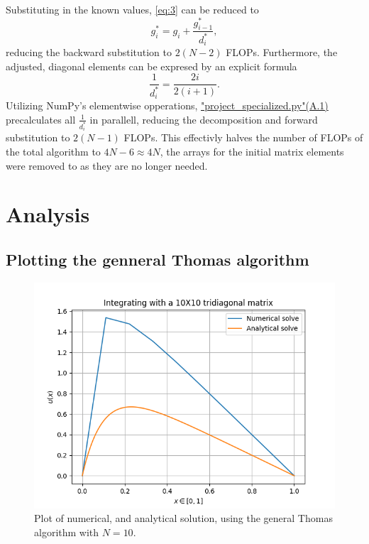 \documentclass[english,notitlepage,reprint]{revtex4-1}  %
\begin{document}
Substituting in the known values, \eqref{eq:3} can be reduced to
$$
	g_{i}^{*} = g_{i} + \frac{g_{i-1}^{*}}{d_{i}^{*}},
$$
reducing the backward substitution to \(2(N-2)\) FLOPs.
Furthermore, the adjusted, diagonal elements can be expresed by an explicit formula
$$
	\frac{1}{d_{i}^{*}}=\frac{2i}{2(i+1)}.
$$
Utilizing NumPy's elementwise opperations, \hyperref[A:2]{"project\_specialized.py"(A.1)} precalculates all \(\frac{1}{d_{i}^{*}}\) in parallell, reducing the decomposition and forward substitution to \(2(N-1)\) FLOPs. This effectivly halves the number of FLOPs of the total algorithm to \(4N-6\approx 4N\), the arrays for the initial matrix elements were removed to as they are no longer needed.

\section{Analysis}\label{sec:4}

\subsection{Plotting the genneral Thomas algorithm}\label{subsec:41}
\begin{figure}[H]
	\centering
	\label{fig:411}
	\includegraphics[width=\columnwidth]{../figures/NumVsAnal10x10.png}
	\caption{Plot of numerical, and analytical solution, using the general Thomas algorithm with
	\(N=10\).}
\end{figure}
\end{document}
